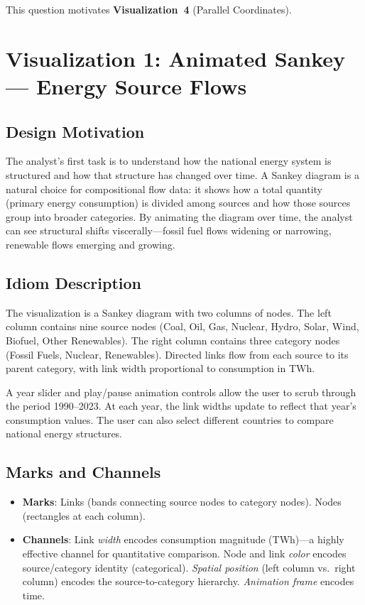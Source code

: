 \documentclass[10pt]{article}
\begin{document}
This question motivates \textbf{Visualization~4} (Parallel Coordinates).


\section{Visualization 1: Animated Sankey --- Energy Source Flows}
\label{sec:viz1}

\subsection{Design Motivation}

The analyst's first task is to understand how the national energy system is structured and how that structure has changed over time. A Sankey diagram is a natural choice for compositional flow data: it shows how a total quantity (primary energy consumption) is divided among sources and how those sources group into broader categories. By animating the diagram over time, the analyst can see structural shifts viscerally---fossil fuel flows widening or narrowing, renewable flows emerging and growing.

\subsection{Idiom Description}

The visualization is a Sankey diagram with two columns of nodes. The left column contains nine source nodes (Coal, Oil, Gas, Nuclear, Hydro, Solar, Wind, Biofuel, Other Renewables). The right column contains three category nodes (Fossil Fuels, Nuclear, Renewables). Directed links flow from each source to its parent category, with link width proportional to consumption in TWh.

A year slider and play/pause animation controls allow the user to scrub through the period 1990--2023. At each year, the link widths update to reflect that year's consumption values. The user can also select different countries to compare national energy structures.

\subsection{Marks and Channels}

\begin{itemize}
    \item \textbf{Marks}: Links (bands connecting source nodes to category nodes). Nodes (rectangles at each column).
    \item \textbf{Channels}: Link \emph{width} encodes consumption magnitude (TWh)---a highly effective channel for quantitative comparison. Node and link \emph{color} encodes source/category identity (categorical). \emph{Spatial position} (left column vs.\ right column) encodes the source-to-category hierarchy. \emph{Animation frame} encodes time.
\end{itemize}
\end{document}
